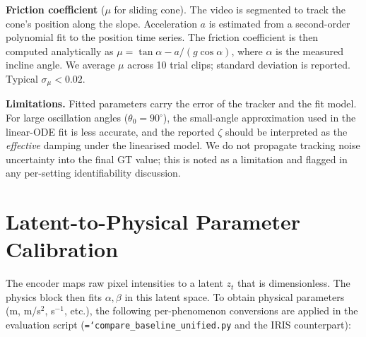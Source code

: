\documentclass[runningheads]{llncs}
\newcommand{\ttt}[1]{\texttt{\hyphenchar\font=`\-\relax #1}}
\begin{document}
\textbf{Friction coefficient} ($\mu$ for sliding cone). The video is
segmented to track the cone's position along the slope. Acceleration $a$ is
estimated from a second-order polynomial fit to the position time series.
The friction coefficient is then computed analytically as
$\mu = \tan\alpha - a/(g\cos\alpha)$, where $\alpha$ is the measured incline
angle. We average $\mu$ across 10 trial clips; standard deviation is reported.
Typical $\sigma_\mu < 0.02$.

\textbf{Limitations.} Fitted parameters carry the error of the tracker and
the fit model. For large oscillation angles ($\theta_0 = 90^\circ$), the
small-angle approximation used in the linear-ODE fit is less accurate, and
the reported $\zeta$ should be interpreted as the \emph{effective} damping
under the linearised model. We do not propagate tracking noise uncertainty
into the final GT value; this is noted as a limitation and flagged in any
per-setting identifiability discussion.


\section{Latent-to-Physical Parameter Calibration}
\label{app:calibration}

The encoder maps raw pixel intensities to a latent $z_t$ that is
dimensionless. The physics block then fits $\alpha, \beta$ in this latent
space. To obtain physical parameters (m, m/s$^2$, s$^{-1}$, etc.), the
following per-phenomenon conversions are applied in the evaluation script
(\ttt{compare\_baseline\_unified.py} and the IRIS counterpart):
\end{document}
